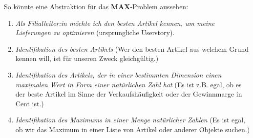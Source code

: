 \noindent
So könnte eine Abstraktion für das \textbf{MAX}-Problem aussehen:
\begin{enumerate}
    \item \emph{Als Filialleiter:in möchte ich den besten Artikel kennen,
        um meine Lieferungen zu optimieren} (ursprüngliche Userstory).
    \item \emph{Identifikation des besten Artikels}
        (Wer den besten Artikel aus welchem Grund kennen will,
        ist für unseren Zweck gleichgültig.)
    \item \emph{Identifikation des Artikels,
        der in einer bestimmten Dimension einen maximalen Wert in Form einer natürlichen Zahl hat}
        (Es ist z.B. egal,
        ob es der beste Artikel im Sinne der Verkaufshäufigkeit
        oder der Gewinnmarge in Cent ist.)
    \item \emph{Identifikation des Maximums in einer Menge natürlicher Zahlen}
        (Es ist egal, ob wir das Maximum in einer Liste von Artikel oder anderer Objekte suchen.)
\end{enumerate}

